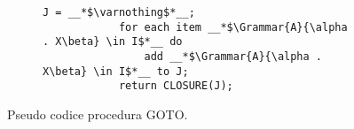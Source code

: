 \documentclass{subfiles}
\begin{document}
\begin{figure}[h!]
    \centering
    \begin{subfigure}[b]{0.3\textwidth}
        \begin{lstlisting}[language = PSEUDO]
            J = __*$\varnothing$*__;
            for each item __*$\Grammar{A}{\alpha . X\beta} \in I$*__ do
                add __*$\Grammar{A}{\alpha . X\beta} \in I$*__ to J;
            return CLOSURE(J);
        \end{lstlisting}
    \end{subfigure}
    \caption{Pseudo codice procedura GOTO.}
    \label{fig:6}
\end{figure}
\end{document}
